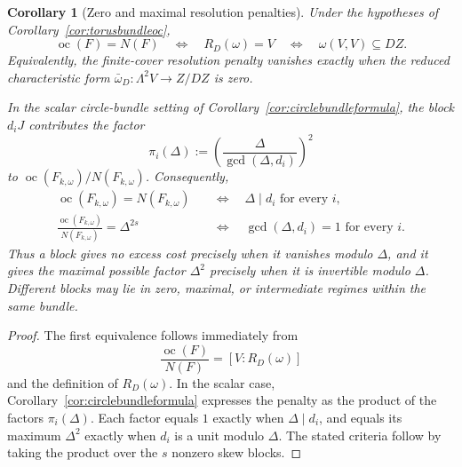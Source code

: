 \documentclass[11pt]{article}
\newtheorem{corollary}[theorem]{Corollary}
\DeclareMathOperator{\oc}{oc}
\begin{document}
\begin{corollary}[Zero and maximal resolution penalties]
\label{cor:penaltydichotomy}
Under the hypotheses of Corollary~\ref{cor:torusbundleoc},
\[
  \oc(F)=N(F)
  \quad\Longleftrightarrow\quad
  R_D(\omega)=V
  \quad\Longleftrightarrow\quad
  \omega(V,V)\subseteq DZ.
\]
Equivalently, the finite-cover resolution penalty vanishes exactly when the
reduced characteristic form
\(
  \bar\omega_D\colon\Lambda^2V\to Z/DZ
\)
is zero.

In the scalar circle-bundle setting of
Corollary~\ref{cor:circlebundleformula}, the block \(d_iJ\) contributes the
factor
\[
  \pi_i(\Delta)
  :=\left(\frac{\Delta}{\gcd(\Delta,d_i)}\right)^2
\]
to \(\oc(F_{k,\omega})/N(F_{k,\omega})\).  Consequently,
\begin{align*}
  \oc(F_{k,\omega})=N(F_{k,\omega})
  &\quad\Longleftrightarrow\quad
  \Delta\mid d_i\text{ for every }i,\\
  \frac{\oc(F_{k,\omega})}{N(F_{k,\omega})}=\Delta^{2s}
  &\quad\Longleftrightarrow\quad
  \gcd(\Delta,d_i)=1\text{ for every }i.
\end{align*}
Thus a block gives no excess cost precisely when it vanishes modulo
\(\Delta\), and it gives the maximal possible factor \(\Delta^2\) precisely
when it is invertible modulo \(\Delta\).  Different blocks may lie in
zero, maximal, or intermediate regimes within the same bundle.
\end{corollary}

\begin{proof}
The first equivalence follows immediately from
\[
  \frac{\oc(F)}{N(F)}=[V:R_D(\omega)]
\]
and the definition of \(R_D(\omega)\).  In the scalar case,
Corollary~\ref{cor:circlebundleformula} expresses the penalty as the product
of the factors \(\pi_i(\Delta)\).  Each factor equals \(1\) exactly when
\(\Delta\mid d_i\), and equals its maximum \(\Delta^2\) exactly when
\(d_i\) is a unit modulo \(\Delta\).  The stated criteria follow by taking
the product over the \(s\) nonzero skew blocks.
\end{proof}
\end{document}
